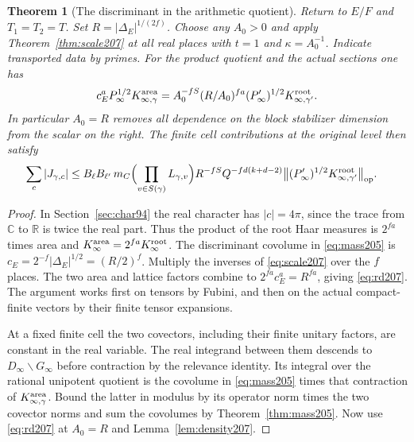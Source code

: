 \documentclass[a4paper,11pt]{article}
\newtheorem{theorem}[proposition]{Theorem}
\theoremstyle{definition}
\theoremstyle{remark}
\newcommand{\RR}{\mathbb R}\newcommand{\CC}{\mathbb C}\newcommand{\QQ}{\mathbb Q}
\numberwithin{equation}{section}
\begin{document}
\begin{theorem}[The discriminant in the arithmetic quotient]
\label{thm:rd207}
Return to \(E/F\) and \(T_1=T_2=T\). Set
\(R=|\Delta_E|^{1/(2f)}\). Choose any \(A_0>0\) and apply
Theorem~\ref{thm:scale207} at all real places with \(t=1\)
and \(\kappa=A_0^{-1}\). Indicate transported data by primes.
For the product quotient and the actual sections one has
\begin{equation}
        c_E^a P_\infty^{1/2}K_{\infty,\gamma}^{\rm area}
       = A_0^{-fS}(R/A_0)^{fa}
                 (P'_\infty)^{1/2}K_{\infty,\gamma'}^{\rm root}.
                                                        \label{eq:rd207}
\end{equation}
In particular \(A_0=R\) removes all dependence on the block
stabilizer dimension from the scalar on the right. The finite
cell contributions at the original level then satisfy
\begin{align}
 \sum_c |J_{\gamma,c}|
 &\le B_\ell B_{\ell'}\,m_C
       \Bigl(\prod_{v\in S(\gamma)}L_{\gamma,v}\Bigr)
          R^{-fS}Q^{-fd(k+d-2)}
          \big\|(P'_\infty)^{1/2}
                       K_{\infty,\gamma'}^{\rm root}\big\|_{\rm op}.
                                                        \label{eq:levelscale207}
\end{align}
\end{theorem}
\begin{proof}
In Section~\ref{sec:char94} the real character has \(|c|=4\pi\),
since the trace from \(\CC\) to \(\RR\) is twice the real part.
Thus the product of the root Haar measures is \(2^{fa}\) times
area and \(K_\infty^{\rm area}=2^{fa}K_\infty^{\rm root}\).
The discriminant covolume in \eqref{eq:mass205} is
\(c_E=2^{-f}|\Delta_E|^{1/2}=(R/2)^f\). Multiply the inverses
of \eqref{eq:scale207} over the \(f\) places. The two area and
lattice factors combine to \(2^{fa}c_E^a=R^{fa}\), giving
\eqref{eq:rd207}. The argument works first on tensors by Fubini,
and then on the actual compact-finite vectors by their finite
tensor expansions.

At a fixed finite cell the two covectors, including their finite
unitary factors, are constant in the real variable. The real
integrand between them descends to \(D_\infty\backslash G_\infty\)
before contraction by the relevance identity. Its integral over
the rational unipotent quotient is the covolume in
\eqref{eq:mass205} times that contraction of
\(K_{\infty,\gamma}^{\rm area}\). Bound the latter in modulus
by its operator norm times the two covector norms and sum the
covolumes by Theorem~\ref{thm:mass205}. Now use \eqref{eq:rd207}
at \(A_0=R\) and Lemma~\ref{lem:density207}.
\end{proof}
\end{document}
